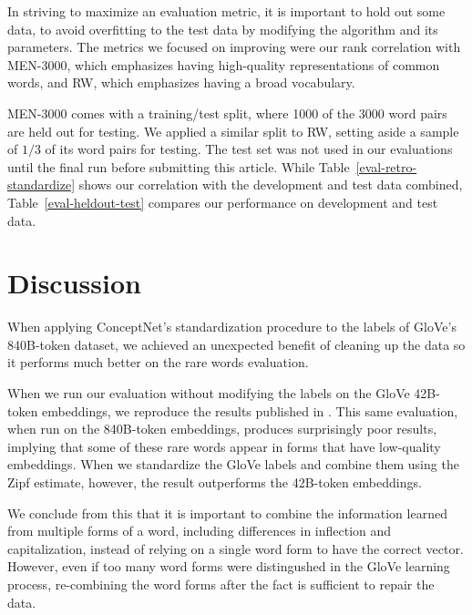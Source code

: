 \documentclass[letterpaper]{article}
\begin{document}

In striving to maximize an evaluation metric, it is important to hold out some
data, to avoid overfitting to the test data by modifying the algorithm and its
parameters. The metrics we focused on improving were our rank correlation with
MEN-3000, which emphasizes having high-quality representations of common words,
and RW, which emphasizes having a broad vocabulary.

MEN-3000
comes with a training/test split, where 1000 of the 3000 word pairs are held
out for testing. We applied a similar split to RW, setting aside a sample
of $1/3$ of its word pairs for testing. The test set was not used in our
evaluations until the final run before submitting this article. While
Table~\ref{eval-retro-standardize} shows our correlation with the development
and test data combined, Table~\ref{eval-heldout-test} compares our performance
on development and test data.



\section{Discussion}

When applying ConceptNet's standardization procedure to the labels of GloVe's
840B-token dataset, we achieved an unexpected benefit of cleaning up the data
so it performs much better on the rare words evaluation.

When we run our evaluation without modifying the labels on the GloVe 42B-token
embeddings, we reproduce the results published in \cite{pennington2014glove}.
This same evaluation, when run on the 840B-token embeddings, produces
surprisingly poor results, implying that some of these rare words appear in
forms that have low-quality embeddings. When we standardize the GloVe labels
and combine them using the Zipf estimate, however, the result outperforms the
42B-token embeddings.

We conclude from this that it is important to combine the information learned
from multiple forms of a word, including differences in inflection and
capitalization, instead of relying on a single word form to have the correct
vector. However, even if too many word forms were distingushed in the GloVe
learning process, re-combining the word forms after the fact is sufficient to
repair the data.
\end{document}
